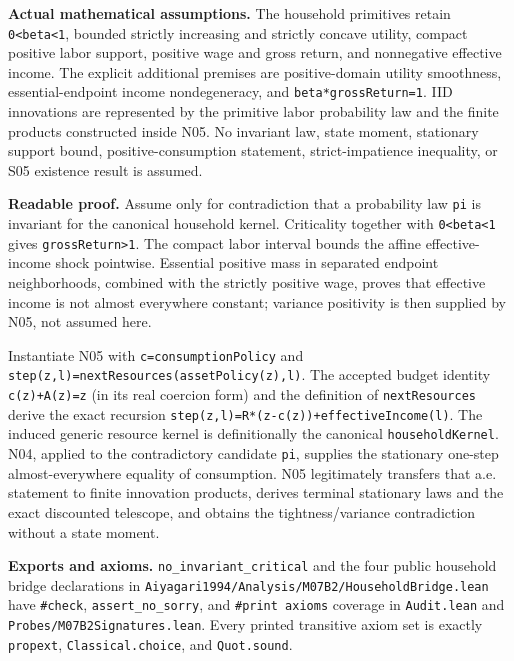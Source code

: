 \documentclass[
  11pt,
]{article}
\let\LedgerOriginalTexttt\texttt
\renewcommand{\texttt}[1]{{\small\LedgerOriginalTexttt{#1}}}
\begin{document}
\textbf{Actual mathematical assumptions.} The household primitives
retain \texttt{0\textless{}beta\textless{}1}, bounded strictly
increasing and strictly concave utility, compact positive labor support,
positive wage and gross return, and nonnegative effective income. The
explicit additional premises are positive-domain utility smoothness,
essential-endpoint income nondegeneracy, and
\texttt{beta*grossReturn=1}. IID innovations are represented by the
primitive labor probability law and the finite products constructed
inside N05. No invariant law, state moment, stationary support bound,
positive-consumption statement, strict-impatience inequality, or S05
existence result is assumed.

\textbf{Readable proof.} Assume only for contradiction that a
probability law \texttt{pi} is invariant for the canonical household
kernel. Criticality together with \texttt{0\textless{}beta\textless{}1}
gives \texttt{grossReturn\textgreater{}1}. The compact labor interval
bounds the affine effective-income shock pointwise. Essential positive
mass in separated endpoint neighborhoods, combined with the strictly
positive wage, proves that effective income is not almost everywhere
constant; variance positivity is then supplied by N05, not assumed here.

Instantiate N05 with \texttt{c=consumptionPolicy} and
\texttt{step(z,l)=nextResources(assetPolicy(z),l)}. The accepted budget
identity \texttt{c(z)+A(z)=z} (in its real coercion form) and the
definition of \texttt{nextResources} derive the exact recursion
\texttt{step(z,l)=R*(z-c(z))+effectiveIncome(l)}. The induced generic
resource kernel is definitionally the canonical
\texttt{householdKernel}. N04, applied to the contradictory candidate
\texttt{pi}, supplies the stationary one-step almost-everywhere equality
of consumption. N05 legitimately transfers that a.e. statement to finite
innovation products, derives terminal stationary laws and the exact
discounted telescope, and obtains the tightness/variance contradiction
without a state moment.

\textbf{Exports and axioms.} \texttt{no\_invariant\_critical} and the
four public household bridge declarations in
\texttt{Aiyagari1994/Analysis/M07B2/HouseholdBridge.lean} have
\texttt{\#check}, \texttt{assert\_no\_sorry}, and
\texttt{\#print\ axioms} coverage in \texttt{Audit.lean} and
\texttt{Probes/M07B2Signatures.lean}. Every printed transitive axiom set
is exactly \texttt{propext}, \texttt{Classical.choice}, and
\texttt{Quot.sound}.
\end{document}
